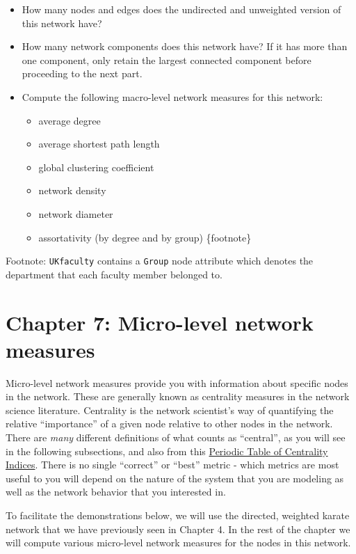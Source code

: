\documentclass[
]{book}
\providecommand{\tightlist}{%
  \setlength{\itemsep}{0pt}\setlength{\parskip}{0pt}}
\begin{document}
\begin{itemize}
\item
  How many nodes and edges does the undirected and unweighted version of this network have?
\item
  How many network components does this network have? If it has more than one component, only retain the largest connected component before proceeding to the next part.
\item
  Compute the following macro-level network measures for this network:

  \begin{itemize}
  \tightlist
  \item
    average degree
  \item
    average shortest path length
  \item
    global clustering coefficient
  \item
    network density
  \item
    network diameter
  \item
    assortativity (by degree and by group) \{footnote\}
  \end{itemize}
\end{itemize}

Footnote: \texttt{UKfaculty} contains a \texttt{Group} node attribute which denotes the department that each faculty member belonged to.

\chapter{Chapter 7: Micro-level network measures}\label{ch7}

Micro-level network measures provide you with information about specific nodes in the network. These are generally known as centrality measures in the network science literature. Centrality is the network scientist's way of quantifying the relative ``importance'' of a given node relative to other nodes in the network. There are \emph{many} different definitions of what counts as ``central'', as you will see in the following subsections, and also from this \href{http://schochastics.net/sna/periodic.html}{Periodic Table of Centrality Indices}. There is no single ``correct'' or ``best'' metric - which metrics are most useful to you will depend on the nature of the system that you are modeling as well as the network behavior that you interested in.

To facilitate the demonstrations below, we will use the directed, weighted karate network that we have previously seen in Chapter 4. In the rest of the chapter we will compute various micro-level network measures for the nodes in this network.
\end{document}
